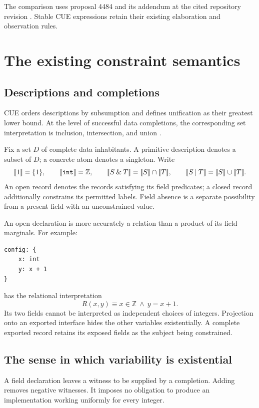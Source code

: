 \documentclass[11pt,a4paper,oneside]{report}
\newcommand{\code}[1]{\texttt{\detokenize{#1}}}
\newcommand{\sem}[1]{\llbracket #1\rrbracket}
\newcommand{\Int}{\mathbb Z}
\theoremstyle{remark}
\newcounter{example}[chapter]
\begin{document}
The comparison uses proposal 4484 and its addendum at the cited repository
revision \cite{cueproposal,cueaddendum}. Stable CUE expressions retain their
existing elaboration and observation rules.

\clearpage
{}
\chapter{The existing constraint semantics}
\label{ch:base}
\section{Descriptions and completions}
CUE orders descriptions by subsumption and defines unification as their greatest
lower bound. At the level of successful data completions, the corresponding
set interpretation is inclusion, intersection, and union
\cite{cuespec}.

Fix a set $D$ of complete data inhabitants. A primitive description denotes a
subset of $D$; a concrete atom denotes a singleton. Write
\[
 \sem{1}=\{1\},\qquad \sem{\code{int}}=\Int,\qquad
 \sem{S\mathbin{\&}T}=\sem S\cap\sem T,\qquad
 \sem{S\mathbin{|}T}=\sem S\cup\sem T.
\]
An open record denotes the records satisfying its field predicates; a closed
record additionally constrains its permitted labels. Field absence is a
separate possibility from a present field with an unconstrained value.

An open declaration is more accurately a relation than a product of its field
marginals. For example:
\par\noindent\begin{minipage}{\linewidth}
\begin{lstlisting}
config: {
    x: int
    y: x + 1
}
\end{lstlisting}
\end{minipage}\par
has the relational interpretation
\[
 R(x,y)\equiv x\in\Int\ \land\ y=x+1.
\]
Its two fields cannot be interpreted as independent choices of integers.
Projection onto an exported interface hides the other variables existentially.
A complete exported record retains its exposed fields as the subject being
constrained.

\section{The sense in which variability is existential}
A field declaration \code{x: int} leaves a witness to be supplied by a completion.
Adding \code{x: >=0} removes negative witnesses. It imposes no obligation to
produce an implementation working uniformly for every integer.
\end{document}
